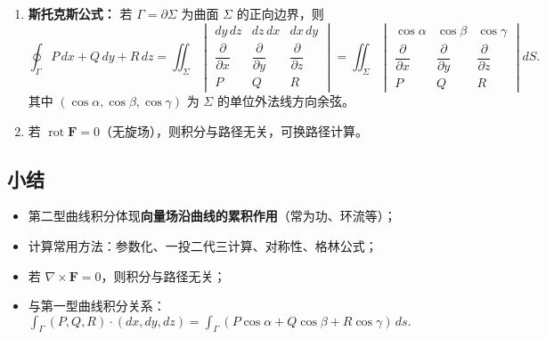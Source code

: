 \begin{enumerate}
\begin{enumerate}
\begin{enumerate}
                              \item \textbf{斯托克斯公式：}
                                    若 $\Gamma=\partial\Sigma$ 为曲面 $\Sigma$ 的正向边界，则
                                    \[
                                          \oint_{\Gamma} P\,dx+Q\,dy+R\,dz
                                          = \iint_{\Sigma}
                                          \begin{vmatrix}
                                                dy\,dz                       & dz\,dx                       & dx\,dy                       \\
                                                \dfrac{\partial}{\partial x} & \dfrac{\partial}{\partial y} & \dfrac{\partial}{\partial z} \\
                                                P                            & Q                            & R
                                          \end{vmatrix}
                                          = \iint_{\Sigma}
                                          \begin{vmatrix}
                                                \cos\alpha                   & \cos\beta                    & \cos\gamma                   \\
                                                \dfrac{\partial}{\partial x} & \dfrac{\partial}{\partial y} & \dfrac{\partial}{\partial z} \\
                                                P                            & Q                            & R
                                          \end{vmatrix} dS.
                                    \]
                                    其中 $(\cos\alpha,\cos\beta,\cos\gamma)$ 为 $\Sigma$ 的单位外法线方向余弦。

                              \item 若 $\operatorname{rot}\mathbf{F}=0$（无旋场），则积分与路径无关，可换路径计算。
                        \end{enumerate}
            \end{enumerate}
\end{enumerate}

\subsection*{小结}

\begin{itemize}
      \item 第二型曲线积分体现\textbf{向量场沿曲线的累积作用}（常为功、环流等）；
      \item 计算常用方法：参数化、一投二代三计算、对称性、格林公式；
      \item 若 $\nabla\times\mathbf{F}=0$，则积分与路径无关；
      \item 与第一型曲线积分关系：$\displaystyle\int_\Gamma (P,Q,R)\cdot(dx,dy,dz) = \int_\Gamma (P\cos\alpha+Q\cos\beta+R\cos\gamma)\,ds.$
\end{itemize}

